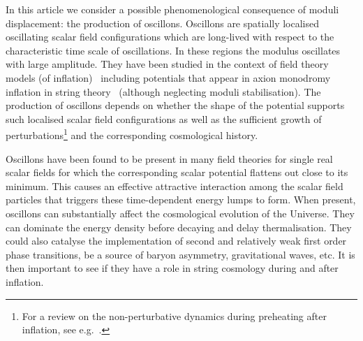 \documentclass[12pt]{article}
\begin{document}
In this article we consider  a possible phenomenological consequence of moduli displacement: the production of oscillons. Oscillons are spatially localised oscillating scalar field configurations which are long-lived with respect to the characteristic time scale of oscillations. In these regions the modulus oscillates with large amplitude. They have been studied in the context of field theory models (of inflation)~\cite{Gleiser:1993pt,Copeland:1995fq,Copeland:2002ku,Broadhead:2005hn,Farhi:2005rz,Fodor:2006zs,Graham:2006vy,Gleiser:2007te,Amin:2011hj,Achilleos:2013zpa,Gleiser:2014ipa,Antusch:2015nla,Antusch:2015ziz,Bond:2015zfa,Liu:2017hua,Antusch:2016con} including potentials that appear in axion monodromy inflation in string theory~\cite{1304.6094} (although neglecting moduli stabilisation). The production of oscillons depends on whether the shape of the potential supports such localised scalar field configurations as well as the sufficient growth of perturbations\footnote{For a review on the non-perturbative dynamics during preheating after inflation, see e.g.~\cite{Amin:2014eta}.} and  the corresponding cosmological history. 

Oscillons have been found to be present in many field theories for single real scalar fields  for which the corresponding scalar potential flattens out close to its minimum. This causes an effective attractive interaction among the scalar field particles that triggers these time-dependent energy lumps to form. When present, oscillons can substantially affect the cosmological evolution of the Universe. They can dominate the energy density  before decaying and delay thermalisation. They could also catalyse the implementation of second and relatively weak first order phase transitions, be a source of baryon asymmetry, gravitational waves, etc. It is then important to see if they have a role in string cosmology during and after inflation.
\end{document}
